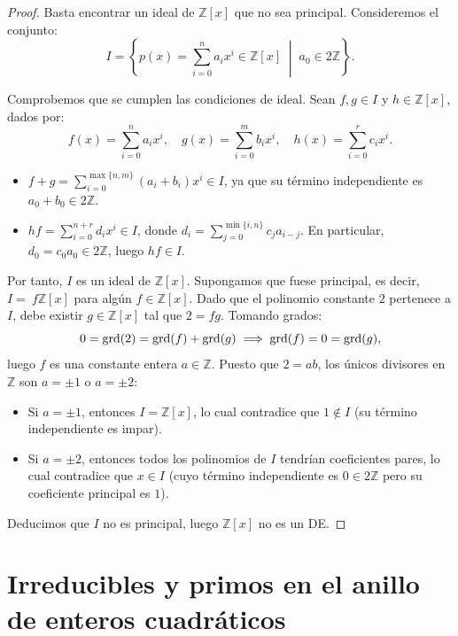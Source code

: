 \begin{proof}
    Basta encontrar un ideal de $\mathbb{Z}[x]$ que no sea principal. Consideremos el conjunto:
    \[
        I = \left\{p(x) = \sum\limits_{i=0}^n a_i x^i \in \mathbb{Z}[x] \;\middle|\; a_0 \in 2\mathbb{Z}\right\}.
    \]

    Comprobemos que se cumplen las condiciones de ideal. Sean $f,g\in I$ y $h \in \mathbb{Z}[x]$, dados por:
    \[
        f(x) = \sum\limits_{i=0}^n a_i x^i, \quad g(x) = \sum\limits_{i=0}^m b_i x^i, \quad h(x) = \sum\limits_{i=0}^r c_i x^i.
    \]
    \begin{itemize}
        \item $f + g = \sum\limits_{i=0}^{\max\{n,m\}} (a_i + b_i) x^i \in I$, ya que su término independiente es $a_0 + b_0 \in 2\mathbb{Z}$.
        \item $hf = \sum\limits_{i=0}^{n+r} d_i x^i \in I$, donde $d_i = \sum\limits_{j=0}^{\min\{i,n\}} c_j a_{i-j}$. En particular, $d_0 = c_0 a_0 \in 2\mathbb{Z}$, luego $hf \in I$.
    \end{itemize}

    Por tanto, $I$ es un ideal de $\mathbb{Z}[x]$. Supongamos que fuese principal, es decir, $I =~f\mathbb{Z}[x]$ para algún $f \in \mathbb{Z}[x]$. Dado que el polinomio constante $2$ pertenece a $I$, debe existir $g \in \mathbb{Z}[x]$ tal que $2 = fg$. Tomando grados:
    \[
        0 = \operatorname{grd}(2) = \operatorname{grd}(f) + \operatorname{grd}(g) \implies \operatorname{grd}(f) = 0 = \operatorname{grd}(g),
    \]
    luego $f$ es una constante entera $a \in \mathbb{Z}$. Puesto que $2 = ab$, los únicos divisores en $\mathbb{Z}$ son $a = \pm 1$ o $a = \pm 2$:
    \begin{itemize}
        \item Si $a = \pm 1$, entonces $I = \mathbb{Z}[x]$, lo cual contradice que $1 \notin I$ (su término independiente es impar).
        \item Si $a = \pm 2$, entonces todos los polinomios de $I$ tendrían coeficientes pares, lo cual contradice que $x \in I$ (cuyo término independiente es $0 \in 2\mathbb{Z}$ pero su coeficiente principal es $1$).
    \end{itemize}
    Deducimos que $I$ no es principal, luego $\mathbb{Z}[x]$ no es un DE.
\end{proof}

\section{Irreducibles y primos en el anillo de enteros cuadráticos}

